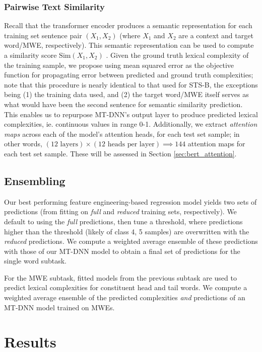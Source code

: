 \documentclass{dcthesis}
\theoremstyle{definition}
\theoremstyle{remark}
\begin{document}
\subsection{Pairwise Text Similarity}

Recall that the transformer encoder produces a semantic representation for each training set sentence pair $(X_1, X_2)$ (where $X_1$ and $X_2$ are a context and target word/MWE, respectively). This semantic representation can be used to compute a similarity score $\text{Sim}(X_1, X_2)$ \citep{liu2019multi}. Given the ground truth lexical complexity of the training sample, we propose using mean squared error as the objective function for propagating error between predicted and ground truth complexities; note that this procedure is nearly identical to that used for STS-B, the exceptions being (1) the training data used, and (2) the target word/MWE itself serves as what would have been the second sentence for semantic similarity prediction. This enables us to repurpose MT-DNN's output layer to produce predicted lexical complexities, ie. continuous values in range 0-1. Additionally, we extract \textit{attention maps} across each of the model's attention heads, for each test set sample; in other words, $(12 \text{ layers}) \times (12 \text{ heads per layer}) \implies 144$ attention maps for each test set sample. These will be assessed in Section \ref{sec:bert_attention}.

\section{Ensembling}

Our best performing feature engineering-based regression model yields two sets of predictions (from fitting on \textit{full} and \textit{reduced} training sets, respectively). We default to using the \textit{full} predictions, then tune a threshold, where predictions higher than the threshold (likely of class 4, 5 samples) are overwritten with the \textit{reduced} predictions. We compute a weighted average ensemble of these predictions with those of our MT-DNN model to obtain a final set of predictions for the single word subtask. 

For the MWE subtask, fitted models from the previous subtask are used to predict lexical complexities for constituent head and tail words. We compute a weighted average ensemble of the predicted complexities \textit{and} predictions of an MT-DNN model trained on MWEs.

\chapter{Results}
\end{document}
